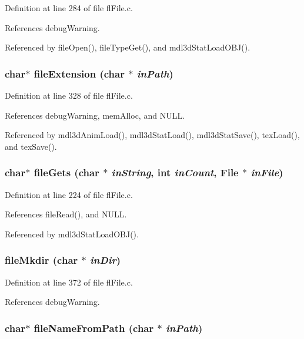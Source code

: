 Definition at line 284 of file fl\-File.c.

References debug\-Warning.

Referenced by file\-Open(), file\-Type\-Get(), and mdl3d\-Stat\-Load\-OBJ().
\subsubsection{\setlength{\rightskip}{0pt plus 5cm}char$\ast$ file\-Extension (char $\ast$ {\em in\-Path})}\label{flFile_8c_af44cc7d91d32ad0474ad4bc359aeaf3}




Definition at line 328 of file fl\-File.c.

References debug\-Warning, mem\-Alloc, and NULL.

Referenced by mdl3d\-Anim\-Load(), mdl3d\-Stat\-Load(), mdl3d\-Stat\-Save(), tex\-Load(), and tex\-Save().
\subsubsection{\setlength{\rightskip}{0pt plus 5cm}char$\ast$ file\-Gets (char $\ast$ {\em in\-String}, int {\em in\-Count}, {\bf File} $\ast$ {\em in\-File})}\label{flFile_8c_2d7ffa40537f5f73b11830033ab1bad4}




Definition at line 224 of file fl\-File.c.

References file\-Read(), and NULL.

Referenced by mdl3d\-Stat\-Load\-OBJ().
\subsubsection{ file\-Mkdir (char $\ast$ {\em in\-Dir})}\label{flFile_8c_e477e900a835500927fc559f80c96136}




Definition at line 372 of file fl\-File.c.

References debug\-Warning.
\subsubsection{\setlength{\rightskip}{0pt plus 5cm}char$\ast$ file\-Name\-From\-Path (char $\ast$ {\em in\-Path})}\label{flFile_8c_fc44c878de74cd1411e468d2d68545c5}




